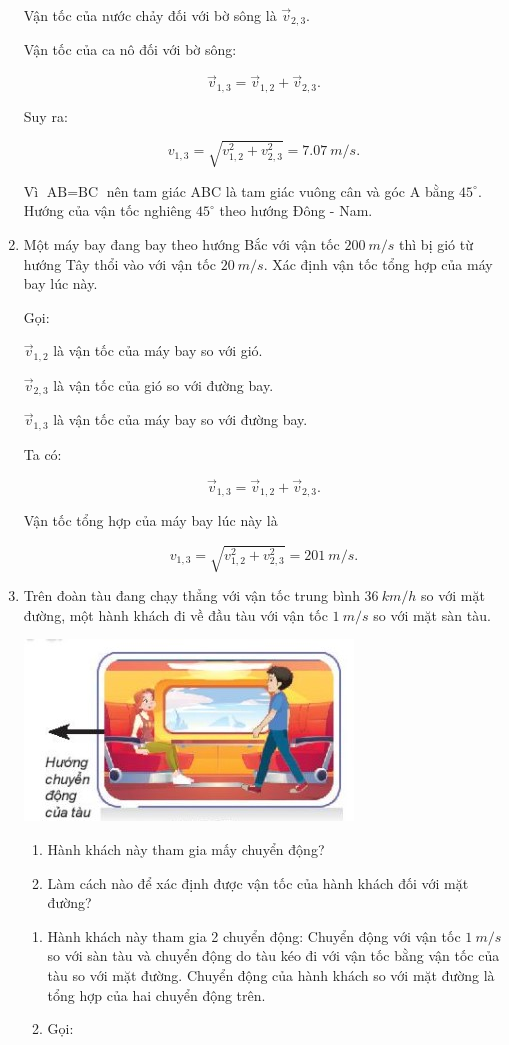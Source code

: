 \begin{enumerate}[label=\bfseries Câu \arabic*:]
{	Vận tốc của nước chảy đối với bờ sông là $\vec v_{2,3}$. 
	
	Vận tốc của ca nô đối với bờ sông:
	
	$$\vec v_{1,3} = \vec v_{1,2} + \vec v_{2,3}.$$
	
	Suy ra:
	
	$$v_{1,3} = \sqrt{ v_{1,2}^2 + v_{2,3}^2} = \SI{7,07}{m/s}.$$
	
	Vì $\text{AB} = \text{BC}$ nên tam giác ABC là tam giác vuông cân và góc A bằng $45^\circ$. Hướng của vận tốc nghiêng $45^\circ$ theo hướng Đông - Nam.
}
\item {}


{
	Một máy bay đang bay theo hướng Bắc với vận tốc $\SI{200}{m/s}$ thì bị gió từ hướng Tây thổi vào với vận tốc $\SI{20}{m/s}$. Xác định vận tốc tổng hợp của máy bay lúc này.
}
\hideall
{
	Gọi:
	
	$\vec v_{1,2}$ là vận tốc của máy bay so với gió.
	
	$\vec v_{2,3}$ là vận tốc của gió so với đường bay.
	
	$\vec v_{1,3}$ là vận tốc của máy bay so với đường bay.
	
	Ta có:
	
	$$\vec v_{1,3} = \vec v_{1,2} + \vec v_{2,3}.$$
	
	Vận tốc tổng hợp của máy bay lúc này là
	
	$$v_{1,3} = \sqrt{v_{1,2}^2 + v^2_{2,3}} = \SI{201}{m/s}.$$
}
\item {}


{
	Trên đoàn tàu đang chạy thẳng với vận tốc trung bình $\SI{36}{km/h}$ so với mặt đường, một hành khách đi về đầu tàu với vận tốc $\SI{1}{m/s}$ so với mặt sàn tàu.
	\begin{center}
		\includegraphics[scale=1]{../figs/VN10-2022-PH-TP005-3.jpg}
	\end{center}
	\begin{enumerate}[label=\alph*)]
		\item Hành khách này tham gia mấy chuyển động?
		\item Làm cách nào để xác định được vận tốc của hành khách đối với mặt đường?
	\end{enumerate}
}
\hideall
{
	\begin{enumerate}[label=\alph*)]
		\item Hành khách này tham gia 2 chuyển động: Chuyển động với vận tốc $\SI{1}{m/s}$ so với sàn tàu và chuyển động do tàu kéo đi với vận tốc bằng vận tốc của tàu so với mặt đường. Chuyển động của hành khách so với mặt đường là tổng hợp của hai chuyển động trên.
		\item Gọi:
		

\end{enumerate}}
\end{enumerate}
